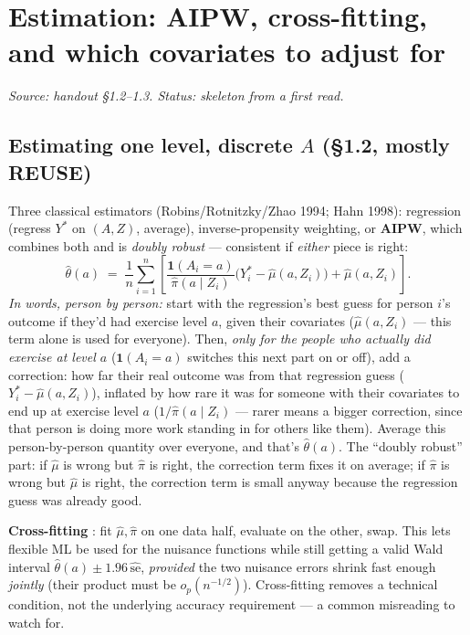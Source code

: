 \section{Estimation: AIPW, cross-fitting, and which covariates to adjust for}
\label{sec:estimation}

\emph{Source: handout \S1.2--1.3. Status: skeleton from a first read.}

\subsection{Estimating one level, discrete \texorpdfstring{$A$}{A} (\S1.2, mostly REUSE)}

Three classical estimators (Robins/Rotnitzky/Zhao 1994; Hahn 1998):
regression (regress $Y^*$ on $(A,Z)$, average), inverse-propensity
weighting, or \textbf{AIPW}, which combines both and is \emph{doubly
robust} --- consistent if \emph{either} piece is right:
\begin{equation}
  \hat\theta(a) \;=\; \frac{1}{n}\sum_{i=1}^n \left[
    \frac{\mathbf{1}(A_i=a)}{\hat\pi(a\mid Z_i)}\big(Y_i^* - \hat\mu(a,Z_i)\big)
    + \hat\mu(a,Z_i) \right].
  \label{eq:aipw}
\end{equation}
\emph{In words, person by person:} start with the regression's best guess
for person $i$'s outcome if they'd had exercise level $a$, given their
covariates ($\hat\mu(a,Z_i)$ --- this term alone is used for everyone). Then,
\emph{only for the people who actually did exercise at level $a$}
($\mathbf{1}(A_i=a)$ switches this next part on or off), add a correction:
how far their real outcome was from that regression guess
($Y_i^* - \hat\mu(a,Z_i)$), inflated by how rare it was for someone with
their covariates to end up at exercise level $a$
($1/\hat\pi(a\mid Z_i)$ --- rarer means a bigger correction, since that
person is doing more work standing in for others like them). Average this
person-by-person quantity over everyone, and that's $\hat\theta(a)$. The
``doubly robust'' part: if $\hat\mu$ is wrong but $\hat\pi$ is right, the
correction term fixes it on average; if $\hat\pi$ is wrong but $\hat\mu$ is
right, the correction term is small anyway because the regression guess was
already good.

\textbf{Cross-fitting} : fit
$\hat\mu, \hat\pi$ on one data half, evaluate on the other, swap. This lets
flexible ML be used for the nuisance functions while still getting a valid
Wald interval $\hat\theta(a) \pm 1.96\,\widehat{\mathrm{se}}$, \emph{provided}
the two nuisance errors shrink fast enough \emph{jointly} (their product
must be $o_p(n^{-1/2})$). Cross-fitting removes a technical condition, not
the underlying accuracy requirement --- a common misreading to watch for.

